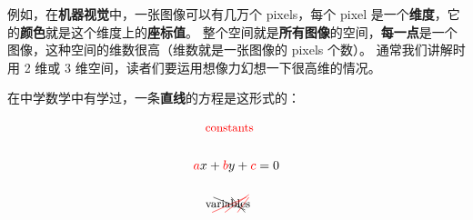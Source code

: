 \documentclass[orivec]{llncs}
\newcommand{\cc}[2]{#1}
\newcommand{\cc}[2]{#2}
\newcommand{\emp}[1]{{\color{blue}\textbf{#1}}}
\newcommand{\tikzmark}[1]{\tikz[overlay,remember picture] \node (#1) {};}
\begin{document}
\cc{
例如，在\emp{机器视觉}中，一张图像可以有几万个 pixels，每个 pixel 是一个\emp{维度}，它的\emp{颜色}就是这个维度上的\emp{座标值}。 整个空间就是\emp{所有图像}的空间，\emp{每一点}是一个图像，这种空间的维数很高（维数就是一张图像的 pixels 个数）。 通常我们讲解时用 2 维或 3 维空间，读者们要运用想像力幻想一下很高维的情况。
}{
For example, in \textbf{machine vision}, a picture can have millions of \textbf{pixels}, each pixel being a dimension, its \textbf{color} is the \textbf{coordinate value} on this dimension.  The entire space is the space of \textbf{all images}, with each \textbf{point} representing an image.  The dimensionality of such spaces is very high (the dimension is the number of pixels per image).  We often use 2 or 3 dimensions for explaining things, but the reader should use their imagination for higher dimensions.
}

\cc{
在中学数学中有学过，一条\emp{直线}的方程是这形式的：
}{
We know from high-school maths, the equation for a \textbf{straight line} is:
}
\begin{eqnarray}
& \mbox{\footnotesize \color{red}{constants}} \tikzmark{constants} \nonumber \\
\nonumber \\
& {\color{red}{a}} \tikzmark{constA} x \tikzmark{varX} + {\color{red}{b}} \tikzmark{constB} y \tikzmark{varY} + {\color{red}{c}} \tikzmark{constC} = 0 \\
\nonumber \\
& \mbox{\footnotesize variables} \tikzmark{variables} \nonumber
\begin{tikzpicture}[overlay,remember picture]
  \draw[red] (constants.center) +(-30pt,-4pt) -- ([shift={(-3pt,8pt)}]constA.center);
  \draw[red] (constants.center) +(-20pt,-4pt) -- ([shift={(-1pt,10pt)}]constB.center);
  \draw[red] (constants.center) +(-10pt,-4pt) -- ([shift={(-1pt,8pt)}]constC.center);
  \draw (variables.center) +(-29pt,8pt) -- ([shift={(-4pt,-2pt)}]varX.center);
  \draw (variables.center) +(-15pt,8pt) -- ([shift={(-4pt,-4pt)}]varY.center);
\end{tikzpicture}
\end{eqnarray}
\end{document}
